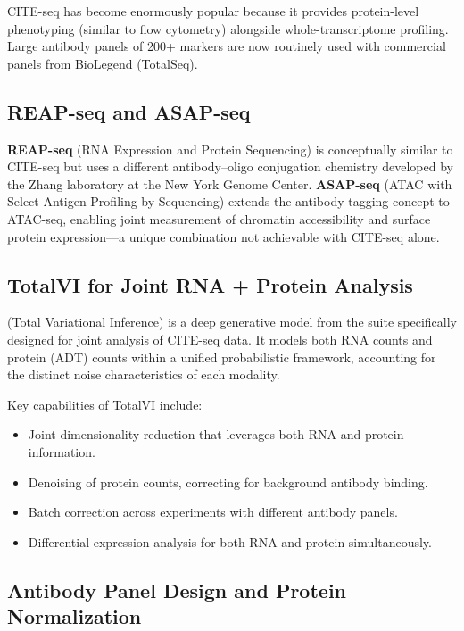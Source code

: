 CITE-seq has become enormously popular because it provides protein-level phenotyping (similar to flow cytometry) alongside whole-transcriptome profiling. Large antibody panels of 200+ markers are now routinely used with commercial panels from BioLegend (TotalSeq).

\subsection{REAP-seq and ASAP-seq}
\label{subsec:multiomics:reap-asap}

\textbf{REAP-seq} (RNA Expression and Protein Sequencing) is conceptually similar to CITE-seq but uses a different antibody--oligo conjugation chemistry developed by the Zhang laboratory at the New York Genome Center. \textbf{ASAP-seq} (ATAC with Select Antigen Profiling by Sequencing) extends the antibody-tagging concept to ATAC-seq, enabling joint measurement of chromatin accessibility and surface protein expression---a unique combination not achievable with CITE-seq alone.

\subsection{TotalVI for Joint RNA + Protein Analysis}
\label{subsec:multiomics:totalvi}

 (Total Variational Inference) is a deep generative model from the  suite specifically designed for joint analysis of CITE-seq data. It models both RNA counts and protein (ADT) counts within a unified probabilistic framework, accounting for the distinct noise characteristics of each modality.

Key capabilities of TotalVI include:
\begin{itemize}[itemsep=2pt]
  \item Joint dimensionality reduction that leverages both RNA and protein information.
  \item Denoising of protein counts, correcting for background antibody binding.
  \item Batch correction across experiments with different antibody panels.
  \item Differential expression analysis for both RNA and protein simultaneously.
\end{itemize}

\subsection{Antibody Panel Design and Protein Normalization}
\label{subsec:multiomics:antibody-design}

